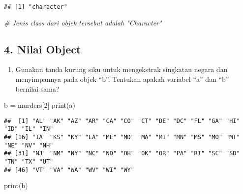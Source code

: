 \documentclass[
]{article}
\newenvironment{Shaded}{\begin{snugshade}}{\end{snugshade}}
\newcommand{\CommentTok}[1]{\textcolor[rgb]{0.56,0.35,0.01}{\textit{#1}}}
\newcommand{\DecValTok}[1]{\textcolor[rgb]{0.00,0.00,0.81}{#1}}
\newcommand{\FunctionTok}[1]{\textcolor[rgb]{0.00,0.00,0.00}{#1}}
\newcommand{\NormalTok}[1]{#1}
\newcommand{\OtherTok}[1]{\textcolor[rgb]{0.56,0.35,0.01}{#1}}
\newcommand{\SpecialCharTok}[1]{\textcolor[rgb]{0.00,0.00,0.00}{#1}}
\providecommand{\tightlist}{%
  \setlength{\itemsep}{0pt}\setlength{\parskip}{0pt}}
\begin{document}
\begin{Shaded}
\end{Shaded}

\begin{verbatim}
## [1] "character"
\end{verbatim}

\begin{Shaded}
\begin{Highlighting}[]
\CommentTok{\# Jenis class dari objek tersebut adalah "Character"}
\end{Highlighting}
\end{Shaded}

\hypertarget{nilai-object}{%
\subsection{4. Nilai Object}\label{nilai-object}}

\begin{enumerate}
\def\labelenumi{\arabic{enumi}.}
\setcounter{enumi}{3}
\tightlist
\item
  Gunakan tanda kurung siku untuk mengekstrak singkatan negara dan
  menyimpannya pada objek ``b''. Tentukan apakah variabel ``a'' dan
  ``b'' bernilai sama?
\end{enumerate}

\begin{Shaded}
\begin{Highlighting}[]
\NormalTok{b }\OtherTok{=}\NormalTok{ murders[}\DecValTok{2}\NormalTok{]}
\FunctionTok{print}\NormalTok{(a)}
\end{Highlighting}
\end{Shaded}

\begin{verbatim}
##  [1] "AL" "AK" "AZ" "AR" "CA" "CO" "CT" "DE" "DC" "FL" "GA" "HI" "ID" "IL" "IN"
## [16] "IA" "KS" "KY" "LA" "ME" "MD" "MA" "MI" "MN" "MS" "MO" "MT" "NE" "NV" "NH"
## [31] "NJ" "NM" "NY" "NC" "ND" "OH" "OK" "OR" "PA" "RI" "SC" "SD" "TN" "TX" "UT"
## [46] "VT" "VA" "WA" "WV" "WI" "WY"
\end{verbatim}

\begin{Shaded}
\begin{Highlighting}[]
\FunctionTok{print}\NormalTok{(b)}
\end{Highlighting}
\end{Shaded}
\end{document}
